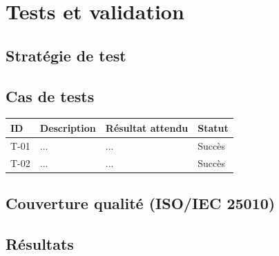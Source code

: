 \section{Tests et validation}
\label{sec:tests}


\subsection{Stratégie de test}

\subsection{Cas de tests}

\begin{center}
  \begin{tabular}{llll}
    \hline
    \textbf{ID} & \textbf{Description} & \textbf{Résultat attendu} & \textbf{Statut} \\
    \hline
    T-01 & ... & ... & Succès \\
    T-02 & ... & ... & Succès \\
    \hline
  \end{tabular}
\end{center}

\subsection{Couverture qualité (ISO/IEC 25010)}

\subsection{Résultats}
